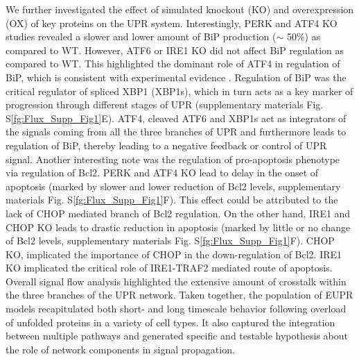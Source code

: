 \documentclass[fleqn,10pt]{wlscirep}
\begin{document}
We further investigated the effect of simulated knockout (KO) and overexpression (OX) of key proteins on the UPR system. Interestingly, PERK and ATF4 KO studies revealed a slower and lower amount of BiP production ($\sim$ 50\%) as compared to WT. However, ATF6 or IRE1 KO did not affect BiP regulation as compared to WT. This highlighted the dominant role of ATF4 in regulation of BiP, which is consistent with experimental evidence \cite{ma2003delineation}. Regulation of BiP was the critical regulator of spliced XBP1 (XBP1s), which in turn acts as a key marker of progression through different stages of UPR (supplementary materials Fig. S\ref{fg:Flux_Supp_Fig1}E). ATF4, cleaved ATF6 and XBP1s act as integrators of the signals coming from all the three branches of UPR and furthermore leads to regulation of BiP, thereby leading to a negative feedback or control of UPR signal. Another interesting note was the regulation of pro-apoptosis phenotype via regulation of Bcl2. PERK and ATF4 KO lead to delay in the onset of apoptosis (marked by slower and lower reduction of Bcl2 levels, supplementary materials Fig. S\ref{fg:Flux_Supp_Fig1}F). This effect could be attributed to the lack of CHOP mediated branch of Bcl2 regulation. On the other hand, IRE1 and CHOP KO leads to drastic reduction in apoptosis (marked by little or no change of Bcl2 levels, supplementary materials Fig. S\ref{fg:Flux_Supp_Fig1}F). CHOP KO, implicated the importance of CHOP in the down-regulation of Bcl2. IRE1 KO implicated the critical role of IRE1-TRAF2 mediated route of apoptosis. Overall signal flow analysis highlighted the extensive amount of crosstalk within the three branches of the UPR network. Taken together, the population of EUPR models recapitulated both short- and long timescale behavior following overload of unfolded proteins in a variety of cell types. It also captured the integration between multiple pathways and generated specific and testable hypothesis about the role of network components in signal propagation.    
\end{document}
